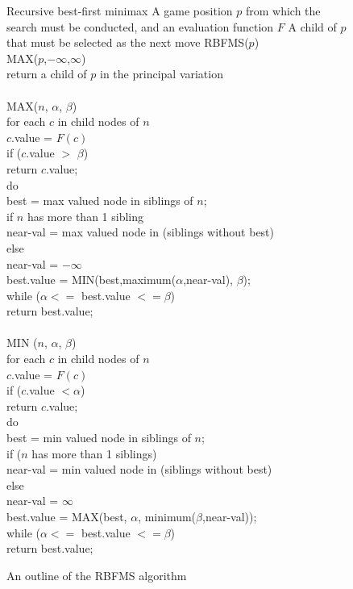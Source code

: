 \begin{figure} [!ht]
\begin{algorithm} 
{Recursive best-first minimax}
{A game position $p$ from which the search must be conducted, and an evaluation function $F$}
{A child of $p$ that must be selected as the next move} 
RBFMS($p$)\+\\
	MAX($p$,$-\infty$,$\infty$) \\
	return a child of $p$ in the principal variation\\
	\-\\
MAX($n$, $\alpha$, $\beta$)\+\\
 	for each $c$ in child nodes of $n$ \+ \\
		 $c$.value = $F(c)$ \\
		 if ($c$.value $>$ $\beta$) \\
			\>return $c$.value; \- \\
	do \+ \\
	best = max valued node in siblings of $n$; \\
	if  $n$ has more than 1 sibling \\
		\> near-val = max valued node in (siblings without best) \\
	else  \\
		\> near-val = $-\infty$	 \\
	best.value = MIN(best,maximum($\alpha$,near-val), $\beta$); \- \\
	while ($\alpha <=$ best.value  $<= \beta$)  \\
	return best.value; \- \\
	\\
MIN  ($n$, $\alpha$, $\beta$) \+ \\
	for each $c$ in child nodes of $n$  \+ \\
		$c$.value = $F(c)$ \\
		if  ($c$.value $< \alpha$) \\
			\> return $c$.value;	 \- \\
	do  \+ \\
	best = min valued node in siblings of $n$; \\
	if  ($n$ has more than 1 siblings)  \\
		\> near-val = min valued node in (siblings without best) \\
	else  \\
		\> near-val = $\infty$	 \\
		best.value = MAX(best, $\alpha$, minimum($\beta$,near-val)); \- \\
	while ($\alpha <=$ best.value  $<= \beta$)  \\
	return best.value; 
\end{algorithm}
\caption{An outline of the RBFMS algorithm}	
\label{alg:rbfms}
\end{figure}
